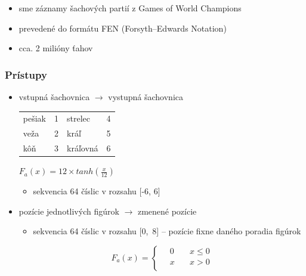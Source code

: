 \documentclass[red]{beamer}
\begin{document}
\begin{frame}
\begin{center}
\begin{minipage}{0.4\textwidth}
\begin{center}
\end{center}
\end{minipage}
\begin{itemize}
\item sme záznamy šachových partií z Games of World Champions
\item prevedené do formátu FEN (Forsyth–Edwards Notation)
\item cca. 2 milióny ťahov 
\end{itemize}
\end{center}
\end{frame}

\begin{frame}
\frametitle{Prístupy} 
\begin{center}
\begin{itemize}
\item vstupná šachovnica $\rightarrow$ vystupná šachovnica

\vspace*{0.2cm}
\begin{minipage}{.5\textwidth}
\begin{center}
{\small
\begin{tabular}{| l l | l l |}
\hline
 pešiak & 1 & strelec & 4 \\
 veža & 2 & kráľ & 5 \\
 kôň & 3 & kráľovná & 6\\
\hline
\end{tabular}
}
\end{center} 
\end{minipage}%
\begin{minipage}{.5\textwidth}
$F_a(x)=12 \times tanh(\frac{x}{12})$
\end{minipage}%
\begin{itemize}
\item sekvencia 64 číslic v rozsahu [-6, 6]
\end{itemize}

\item pozície jednotlivých figúrok $ \rightarrow $ zmenené pozície

\begin{minipage}{.5\textwidth}
\begin{itemize}
\item sekvencia 64 číslic v rozsahu [0,~8] -- pozície fixne daného poradia figúrok
\end{itemize}
\end{minipage}%
\begin{minipage}{.5\textwidth}
\[ F_a(x) =
  \begin{cases}
    \quad 0  & \quad x \leq 0 \\
    \quad x  & \quad x > 0\\
  \end{cases}
\]
\end{minipage}%


\end{itemize}
\end{center}
\end{frame}
\end{document}
